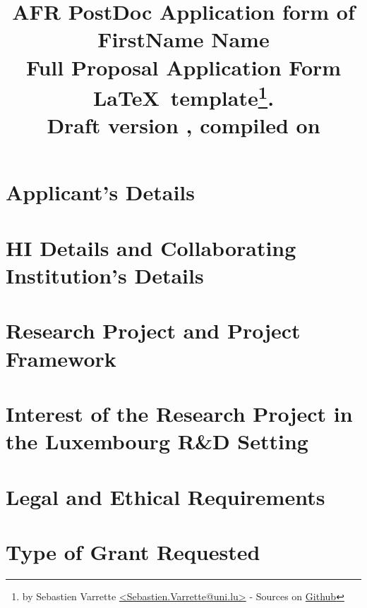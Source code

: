 \documentclass[11pt,twoside,a4paper]{article}
\title{\textbf{\Large AFR PostDoc Application form of FirstName Name} \\[1em]
  {\small Full Proposal Application Form \LaTeX\ template\thanks{by Sebastien
      Varrette {\small \url{<Sebastien.Varrette@uni.lu>}} - Sources on \href{https://github.com/Falkor/fnr-latex-template}{Github}}.\\
      \textbf{Draft version \docversion}, compiled on \isodayandtime}
}
\author{}
\date{}
\begin{document}
\maketitle

\tableofcontents
\clearpage

\section{Applicant's Details}



\section{\acf{HI} Details and Collaborating Institution's Details}



\section{Research Project and Project Framework}


\section{Interest of the Research Project in the Luxembourg R\&D Setting}


\section{Legal and Ethical Requirements}


\section{Type of Grant Requested}


\end{document}
